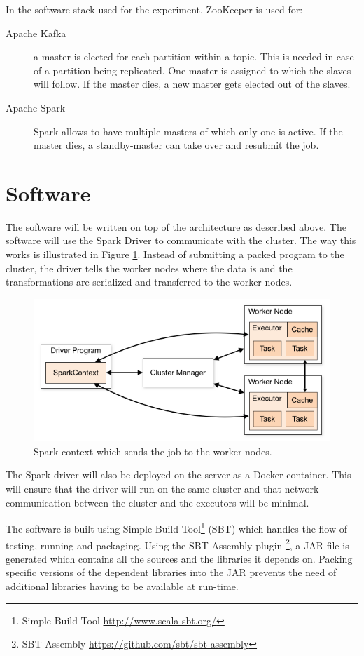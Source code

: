 In the software-stack used for the experiment, ZooKeeper is used for:
\begin{description} 
    \item[Apache Kafka] a master is elected for each partition within a topic. This is needed in case of a partition being replicated. One master is assigned to which the slaves will follow. If the master dies, a new master gets elected out of the slaves. 
    \item[Apache Spark] Spark allows to have multiple masters of which only one is active. If the master dies, a standby-master can take over and resubmit the job.
\end{description}

\section{Software}

The software will be written on top of the architecture as described above. The software will use the Spark Driver to communicate with the cluster. The way this works is illustrated in Figure \ref{fig:driver}. Instead of submitting a packed program to the cluster, the driver tells the worker nodes where the data is and the transformations are serialized and transferred to the worker nodes.

\begin{figure}[ht!]
\centering
\includegraphics[width=\textwidth]{figures/clusterdriver.png}
\caption{Spark context which sends the job to the worker nodes. \label{fig:driver}}
\end{figure}

The Spark-driver will also be deployed on the server as a Docker container. This will ensure that the driver will run on the same cluster and that network communication between the cluster and the executors will be minimal.

The software is built using Simple Build Tool\footnote{Simple Build Tool \url{http://www.scala-sbt.org/}} (SBT) which handles the flow of testing, running and packaging. Using the SBT Assembly plugin \footnote{SBT Assembly \url{https://github.com/sbt/sbt-assembly}}, a JAR file is generated which contains all the sources and the libraries it depends on. Packing specific versions of the dependent libraries into the JAR prevents the need of additional libraries having to be available at run-time.

